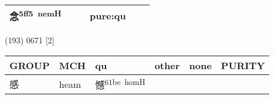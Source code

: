 \documentclass[14pt,a4paper]{scrartcl}
\begin{document}
\begin{longtable}[c]{@{}llllll@{}}
\begin{minipage}[t]{0.14\columnwidth}\raggedright\strut
念\textsuperscript{5ff5~nemH}
\strut\end{minipage} &
\begin{minipage}[t]{0.14\columnwidth}\raggedright\strut
\strut\end{minipage} &
\begin{minipage}[t]{0.14\columnwidth}\raggedright\strut
\strut\end{minipage} &
\begin{minipage}[t]{0.14\columnwidth}\raggedright\strut
pure:qu
\strut\end{minipage}\tabularnewline
\bottomrule
\end{longtable}

(193) 0671 {[}2{]}

\begin{longtable}[c]{@{}llllll@{}}
\toprule
\begin{minipage}[b]{0.14\columnwidth}\raggedright\strut
GROUP
\strut\end{minipage} &
\begin{minipage}[b]{0.14\columnwidth}\raggedright\strut
MCH
\strut\end{minipage} &
\begin{minipage}[b]{0.14\columnwidth}\raggedright\strut
qu
\strut\end{minipage} &
\begin{minipage}[b]{0.14\columnwidth}\raggedright\strut
other
\strut\end{minipage} &
\begin{minipage}[b]{0.14\columnwidth}\raggedright\strut
none
\strut\end{minipage} &
\begin{minipage}[b]{0.14\columnwidth}\raggedright\strut
PURITY
\strut\end{minipage}\tabularnewline
\midrule
\endhead
\begin{minipage}[t]{0.14\columnwidth}\raggedright\strut
感
\strut\end{minipage} &
\begin{minipage}[t]{0.14\columnwidth}\raggedright\strut
heam
\strut\end{minipage} &
\begin{minipage}[t]{0.14\columnwidth}\raggedright\strut
憾\textsuperscript{61be~homH}
\strut\end{minipage} &
\begin{minipage}[t]{0.14\columnwidth}\raggedright\strut
\strut\end{minipage} &

\end{longtable}
\end{document}
